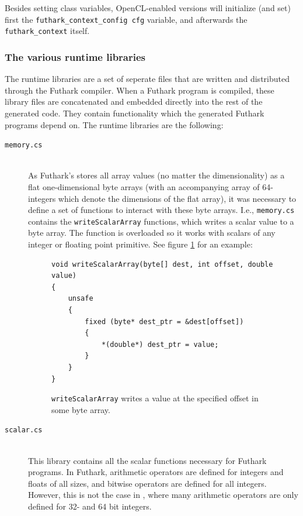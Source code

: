 \begin{description}
Besides setting class variables, OpenCL-enabled versions will initialize (and
set) first the \texttt{futhark\_context\_config cfg} variable, and afterwards
the \texttt{futhark\_context} itself.

\subsubsection{The various runtime libraries}
\label{subsec:runtimelibs}

The runtime libraries are a set of seperate \csharp{} files that are written and
distributed through the Futhark compiler. When a Futhark program is compiled,
these library files are concatenated and embedded directly into the rest of the
generated code. They contain functionality which the generated Futhark programs
depend on.
The runtime libraries are the following:
\begin{description}
\item[\texttt{memory.cs}] \hfill\\
  As Futhark's stores all array values (no matter the dimensionality) as a flat one-dimensional byte arrays (with an accompanying
  array of 64-integers which denote the dimensions of the flat array), it was
  necessary to define a set of functions to interact with these byte arrays.
  I.e., \texttt{memory.cs} contains the \texttt{writeScalarArray} functions,
  which writes a scalar value to a byte array. The function is overloaded so it
  works with scalars of any integer or floating point primitive. See figure
  \ref{fig:writeScalarArray} for an example:

\begin{figure}[h]
\centering
\begin{verbatim}
void writeScalarArray(byte[] dest, int offset, double value)
{
    unsafe
    {
        fixed (byte* dest_ptr = &dest[offset])
        {
            *(double*) dest_ptr = value;
        }
    }
}
\end{verbatim}
\caption{\texttt{writeScalarArray} writes a value at the specified offset in
some byte array.}
\label{fig:writeScalarArray}
\end{figure}

\item[\texttt{scalar.cs}] \hfill\\
  This library contains all the scalar functions necessary for Futhark \csharp{}
  programs.
  In Futhark, arithmetic operators are defined for integers and floats of all
  sizes, and bitwise operators are defined for all integers.
  However, this is not the case in \csharp{}, where many arithmetic operators
  are only defined for 32- and 64 bit integers.
  

\end{description}
\end{description}
